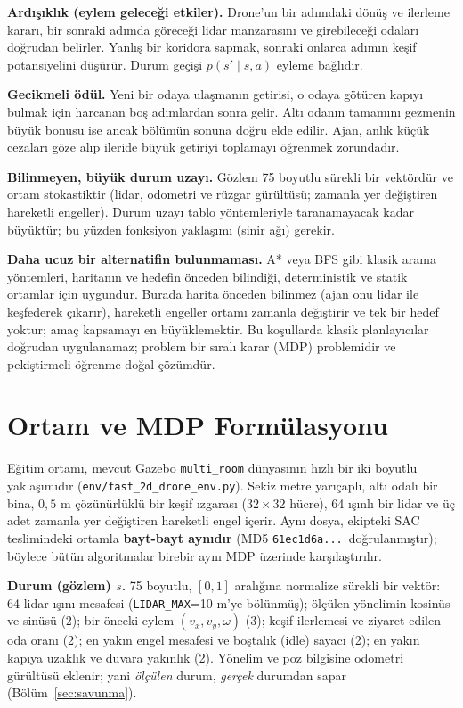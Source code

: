 \documentclass[11pt,a4paper]{article}
\newcommand{\reff}[1]{\texttt{#1}}
\begin{document}
\textbf{Ardışıklık (eylem geleceği etkiler).} Drone'un bir adımdaki dönüş ve
ilerleme kararı, bir sonraki adımda göreceği lidar manzarasını ve girebileceği
odaları doğrudan belirler. Yanlış bir koridora sapmak, sonraki onlarca adımın
keşif potansiyelini düşürür. Durum geçişi $p(s'\mid s,a)$ eyleme bağlıdır.

\textbf{Gecikmeli ödül.} Yeni bir odaya ulaşmanın getirisi, o odaya götüren kapıyı
bulmak için harcanan boş adımlardan sonra gelir. Altı odanın tamamını gezmenin büyük
bonusu ise ancak bölümün sonuna doğru elde edilir. Ajan, anlık küçük cezaları göze
alıp ileride büyük getiriyi toplamayı öğrenmek zorundadır.

\textbf{Bilinmeyen, büyük durum uzayı.} Gözlem 75 boyutlu sürekli bir vektördür ve
ortam stokastiktir (lidar, odometri ve rüzgar gürültüsü; zamanla yer değiştiren
hareketli engeller). Durum uzayı tablo yöntemleriyle taranamayacak kadar büyüktür;
bu yüzden fonksiyon yaklaşımı (sinir ağı) gerekir.

\textbf{Daha ucuz bir alternatifin bulunmaması.} A* veya BFS gibi klasik arama
yöntemleri, haritanın ve hedefin önceden bilindiği, deterministik ve statik ortamlar
için uygundur. Burada harita önceden bilinmez (ajan onu lidar ile keşfederek çıkarır),
hareketli engeller ortamı zamanla değiştirir ve tek bir hedef yoktur; amaç kapsamayı
en büyüklemektir. Bu koşullarda klasik planlayıcılar doğrudan uygulanamaz; problem
bir sıralı karar (MDP) problemidir ve pekiştirmeli öğrenme doğal çözümdür.

\section{Ortam ve MDP Formülasyonu}
Eğitim ortamı, mevcut Gazebo \reff{multi\_room} dünyasının hızlı bir iki boyutlu
yaklaşımıdır (\reff{env/fast\_2d\_drone\_env.py}). Sekiz metre yarıçaplı, altı odalı
bir bina, $0{,}5$ m çözünürlüklü bir keşif ızgarası ($32\times32$ hücre), 64 ışınlı
bir lidar ve üç adet zamanla yer değiştiren hareketli engel içerir. Aynı dosya,
ekipteki SAC teslimindeki ortamla \textbf{bayt-bayt aynıdır} (MD5
\reff{61ec1d6a...}\ doğrulanmıştır); böylece bütün algoritmalar birebir aynı MDP
üzerinde karşılaştırılır.

\textbf{Durum (gözlem) $s$.} 75 boyutlu, $[0,1]$ aralığına normalize sürekli bir
vektör: 64 lidar ışını mesafesi (\reff{LIDAR\_MAX}=10 m'ye bölünmüş); ölçülen
yönelimin kosinüs ve sinüsü (2); bir önceki eylem $(v_x, v_y, \omega)$ (3); keşif
ilerlemesi ve ziyaret edilen oda oranı (2); en yakın engel mesafesi ve boştalık
(idle) sayacı (2); en yakın kapıya uzaklık ve duvara yakınlık (2). Yönelim ve poz
bilgisine odometri gürültüsü eklenir; yani \emph{ölçülen} durum, \emph{gerçek}
durumdan sapar (Bölüm~\ref{sec:savunma}).
\end{document}

